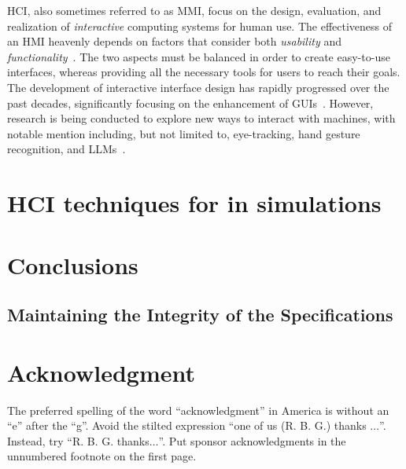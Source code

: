 \documentclass[conference]{IEEEtran}
\begin{document}
\ac{HCI},
also sometimes referred to as \ac{MMI},
focus on the design, evaluation, and realization of \emph{interactive} computing systems for human use.
The effectiveness of an \ac{HMI} heavenly depends on factors that consider both \emph{usability} and \emph{functionality}~\cite{Sinha2010}.
%
The two aspects must be balanced in order to create easy-to-use interfaces,
whereas providing all the necessary tools for users to reach their goals.
%
The development of interactive interface design has rapidly progressed over the past decades,
significantly focusing on the enhancement of \acp{GUI}~\cite{Murad2019}.
%
However,
research is being conducted to explore new ways to interact with machines,
with notable mention including,
but not limited to,
eye-tracking,
hand gesture recognition,
and \acp{LLM}~\cite{Poole2006, Sarma2021, kapania2024imcategorizingllmproductivity}.

\section{\ac{HCI} techniques for in simulations}

\section{Conclusions}

\subsection{Maintaining the Integrity of the Specifications}

\section*{Acknowledgment}

The preferred spelling of the word ``acknowledgment'' in America is without 
an ``e'' after the ``g''. Avoid the stilted expression ``one of us (R. B. 
G.) thanks $\ldots$''. Instead, try ``R. B. G. thanks$\ldots$''. Put sponsor 
acknowledgments in the unnumbered footnote on the first page.



\vspace{12pt}
\end{document}
